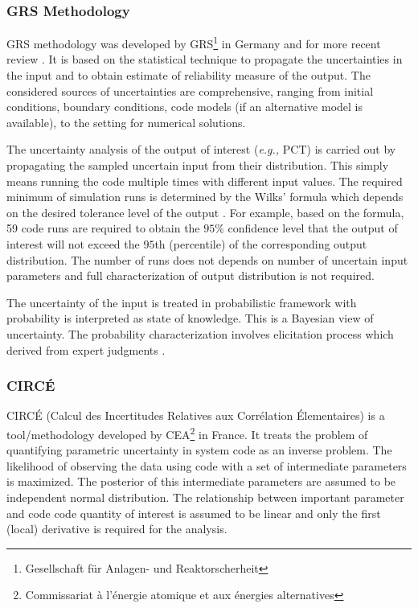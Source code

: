 \documentclass[11pt,titlepage]{article}
\begin{document}
\subsubsection{GRS Methodology}

GRS methodology was developed by GRS\footnote{Gesellschaft f\"ur Anlagen- und Reaktorscherheit} in Germany \cite{Glaeser1994} and for more recent review \cite{Glaeser2008}. 
It is based on the statistical technique to propagate the uncertainties in the input and to obtain estimate of reliability measure of the output. 
The considered sources of uncertainties are comprehensive, ranging from initial conditions, boundary conditions, code models (if an alternative model is available), to the setting for numerical solutions.

The uncertainty analysis of the output of interest (\textit{e.g.,} PCT) is carried out by propagating the sampled uncertain input from their distribution. 
This simply means running the code multiple times with different input values. 
The required minimum of simulation runs is determined by the Wilks' formula \cite{Wilks1942} which depends on the desired tolerance level of the output \cite{Glaeser2008}. 
For example, based on the formula, 59 code runs are required to obtain the $95\%$ confidence level that the output of interest will not exceed the $95$th (percentile) of the corresponding output distribution.
The number of runs does not depends on number of uncertain input parameters and full characterization of output distribution is not required.

The uncertainty of the input is treated in probabilistic framework with probability is interpreted as state of knowledge. 
This is a Bayesian view of uncertainty. 
The probability characterization involves elicitation process which derived from expert judgments \cite{Glaeser1994}. 

\subsubsection{CIRCÉ}

CIRCÉ (Calcul des Incertitudes Relatives aux Corrélation Élementaires) is a tool/methodology developed by CEA\footnote{Commissariat à l'énergie atomique et aux énergies alternatives} in France. 
It treats the problem of quantifying parametric uncertainty in system code as an inverse problem. 
The likelihood of observing the data using code with a set of intermediate parameters is maximized. 
The posterior of this intermediate parameters are assumed to be independent normal distribution. 
The relationship between important parameter and code code quantity of interest is assumed to be linear and only the first (local) derivative is required for the analysis.
\end{document}

